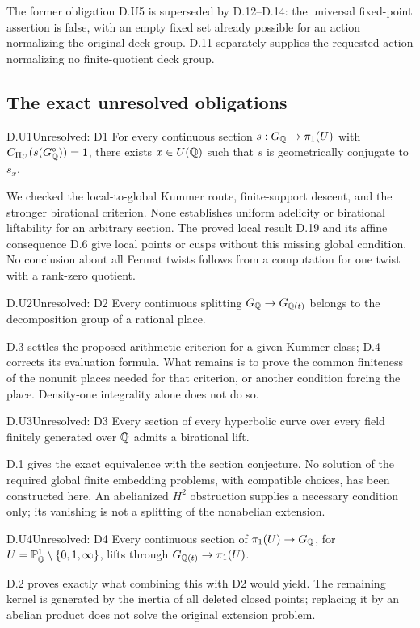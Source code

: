 

The former obligation D.U5 is superseded by D.12--D.14:
the universal fixed-point assertion is false, with an empty
fixed set already possible for an action normalizing the
original deck group. D.11 separately supplies the requested
action normalizing no finite-quotient deck group.






\subsection{The exact unresolved obligations}

\begin{claim}{D.U1}{Unresolved: D1}
For every continuous section $s:G_\mathbb Q\to\pi_1(U)$ with
$C_{\Pi_U}(s(G_\mathbb Q^\circ))=1$, there exists $x\in U(\mathbb Q)$
such that $s$ is geometrically conjugate to $s_x$.
\end{claim}
We checked the local-to-global Kummer route, finite-support descent,
and the stronger birational criterion. None establishes uniform
adelicity or birational liftability for an arbitrary section.
The proved local result D.19 and its affine consequence D.6 give
local points or cusps without this missing global condition.
No conclusion about all Fermat twists follows
from a computation for one twist with a rank-zero quotient.

\begin{claim}{D.U2}{Unresolved: D2}
Every continuous splitting $G_\mathbb Q\to G_{\mathbb Q(t)}$ belongs to the
decomposition group of a rational place.
\end{claim}
D.3 settles the proposed arithmetic criterion for a given Kummer
class; D.4 corrects its evaluation formula. What remains is to
prove the common finiteness of the nonunit places needed for that
criterion, or another condition forcing the place. Density-one
integrality alone does not do so.

\begin{claim}{D.U3}{Unresolved: D3}
Every section of every hyperbolic curve over every field finitely
generated over $\mathbb Q$ admits a birational lift.
\end{claim}
D.1 gives the exact equivalence with the section conjecture. No
solution of the required global finite embedding problems, with
compatible choices, has been constructed here. An abelianized
$H^2$ obstruction supplies a necessary condition only; its
vanishing is not a splitting of the nonabelian extension.

\begin{claim}{D.U4}{Unresolved: D4}
Every continuous section of $\pi_1(U)\to G_\mathbb Q$, for
$U=\mathbb P^1_\mathbb Q\setminus\{0,1,\infty\}$, lifts through
$G_{\mathbb Q(t)}\to\pi_1(U)$.
\end{claim}
D.2 proves exactly what combining this with D2 would yield.
The remaining kernel is generated by the inertia of all deleted
closed points; replacing it by an abelian product does not solve
the original extension problem.

